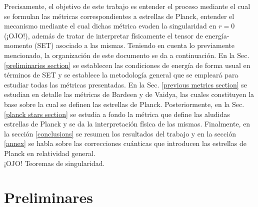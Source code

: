 \documentclass{article}
\numberwithin{equation}{section}
\theoremstyle{definition}
\begin{document}
Precisamente, el objetivo de este trabajo es entender el proceso mediante el cual se formulan las métricas correspondientes a estrellas de Planck, entender el mecanismo mediante el cual dichas métrica evaden la singularidad en $r = 0$ (¡OJO!), además de tratar de interpretar físicamente el tensor de energía-momento (SET) asociado a las mismas. Teniendo en cuenta lo previamente mencionado, la organización de este documento se da a continuación. En la Sec. \ref{preliminaries section} se establecen las condiciones de energía de forma usual en términos de SET y se establece la metodología general que se empleará para estudiar todas las métricas presentadas. En la Sec. \ref{previous metrics section} se estudian en detalle las métricas de Bardeen y de Vaidya, las cuales constituyen la base sobre la cual se definen las estrellas de Planck. Posteriormente, en la Sec. \ref{planck stars section} se estudia a fondo la métrica que define las aludidas estrellas de Planck y se da la interpretación física de las mismas. Finalmente, en la sección \ref{conclusions} se resumen los resultados del trabajo y en la sección \ref{annex} se habla sobre las correcciones cuánticas que introducen las estrellas de Planck en relatividad general.\\

¡OJO! Teoremas de singularidad.

\section{\label{preliminaries section} Preliminares}
\end{document}
